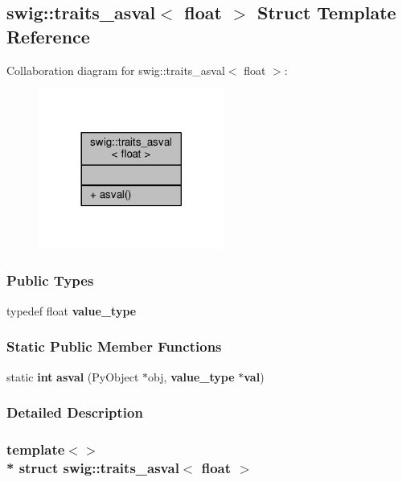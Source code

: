 \subsection{swig\+:\+:traits\+\_\+asval$<$ float $>$ Struct Template Reference}
\label{structswig_1_1traits__asval_3_01float_01_4}


Collaboration diagram for swig\+:\+:traits\+\_\+asval$<$ float $>$\+:
\nopagebreak
\begin{figure}[H]
\begin{center}
\leavevmode
\includegraphics[width=173pt]{d2/d5e/structswig_1_1traits__asval_3_01float_01_4__coll__graph}
\end{center}
\end{figure}
\subsubsection*{Public Types}
\begin{DoxyCompactItemize}
\item 
typedef float {\bf value\+\_\+type}
\end{DoxyCompactItemize}
\subsubsection*{Static Public Member Functions}
\begin{DoxyCompactItemize}
\item 
static {\bf int} {\bf asval} (Py\+Object $\ast$obj, {\bf value\+\_\+type} $\ast${\bf val})
\end{DoxyCompactItemize}


\subsubsection{Detailed Description}
\subsubsection*{template$<$$>$\\*
struct swig\+::traits\+\_\+asval$<$ float $>$}



